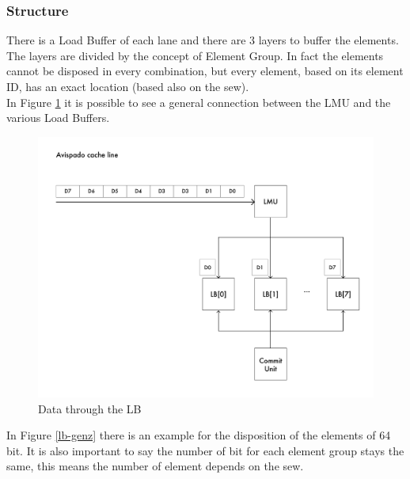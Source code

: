 \subsubsection{Structure}
There is a Load Buffer of each lane and there are 3 layers to buffer the elements. The layers are divided by the concept of Element Group. In fact the elements cannot be disposed in every combination, but every element, based on its element ID, has an exact location (based also on the sew).\\

In Figure \ref{gen-ex} it is possible to see a general connection between the LMU and the various Load Buffers.\\

\begin{figure}[H]
    \centering
    \includegraphics[scale = 0.5]{Chapter_2/img/cache-to-lb-gen-ex.png}
    \caption{Data through the LB}
    \label{gen-ex}
\end{figure}


In Figure \ref{lb-genz} there is an example for the disposition of the elements of 64 bit. It is also important to say the number of bit for each element group stays the same, this means the number of element depends on the sew.\\


